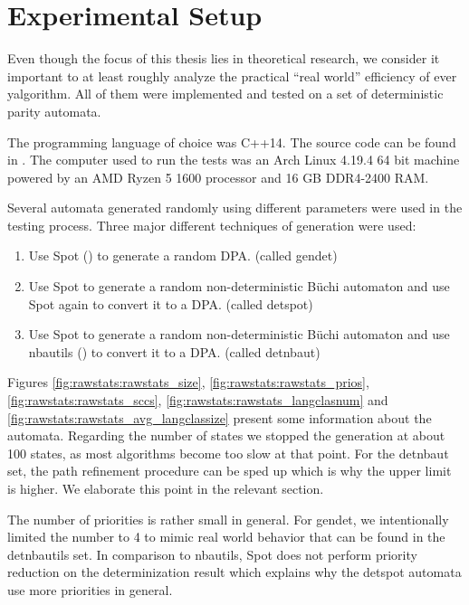 



\section{Experimental Setup} %
Even though the focus of this thesis lies in theoretical research, we consider it important to at least roughly analyze the practical \enquote{real world} efficiency of ever yalgorithm. All of them were implemented and tested on a set of deterministic parity automata.

The programming language of choice was C++14. The source code can be found in \cite{Tollkoetter2018}. The computer used to run the tests was an Arch Linux 4.19.4 64 bit machine powered by an AMD Ryzen 5 1600 processor and 16 GB DDR4-2400 RAM.


Several automata generated randomly using different parameters were used in the testing process. Three major different techniques of generation were used:

\begin{enumerate}
	\item Use Spot (\cite{duret.16.atva2}) to generate a random DPA. (called \textsf{gendet})
	\item Use Spot to generate a random non-deterministic B\"uchi automaton and use Spot again to convert it to a DPA. (called \textsf{detspot})
	\item Use Spot to generate a random non-deterministic B\"uchi automaton and use nbautils (\cite{Pirogov2018}) to convert it to a DPA. (called \textsf{detnbaut})
\end{enumerate}

Figures \ref{fig:rawstats:rawstats_size}, \ref{fig:rawstats:rawstats_prios}, \ref{fig:rawstats:rawstats_sccs}, \ref{fig:rawstats:rawstats_langclasnum} and \ref{fig:rawstats:rawstats_avg_langclassize} present some information about the automata. Regarding the number of states we stopped the generation at about 100 states, as most algorithms become too slow at that point. For the detnbaut set, the path refinement procedure can be sped up which is why the upper limit is higher. We elaborate this point in the relevant section.

The number of priorities is rather small in general. For gendet, we intentionally limited the number to 4 to mimic real world behavior that can be found in the detnbautils set. In comparison to nbautils, Spot does not perform priority reduction on the determinization result which explains why the detspot automata use more priorities in general.

